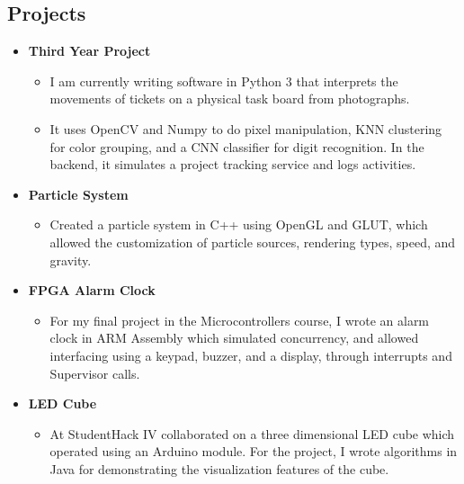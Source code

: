 \documentclass[hidelinks,11pt,a4paper,roman]{moderncv}
\begin{document}
\subsection{Projects}
\begin{itemize}%
\item \textbf{Third Year Project}
  \begin{itemize}%
  \item {I am currently writing software in Python 3 that interprets the movements of tickets on a physical task board from photographs.}
  \item {It uses OpenCV and Numpy to do pixel manipulation, KNN clustering for color grouping, and a CNN classifier for digit recognition. In the backend, it simulates a project tracking service and logs activities.}
  \end{itemize}
\item \textbf{Particle System}
  \begin{itemize}
    \item {Created a particle system in C++ using OpenGL and GLUT, which allowed the customization of particle sources, rendering types, speed, and gravity.}
  \end{itemize}
\item \textbf{FPGA Alarm Clock}
  \begin{itemize}
    \item {For my final project in the Microcontrollers course, I wrote an alarm clock in ARM Assembly which simulated concurrency, and allowed interfacing using a keypad, buzzer, and a display, through interrupts and Supervisor calls.}
  \end{itemize}
\item \textbf{LED Cube}
\begin{itemize}
  \item{At StudentHack IV collaborated on a three dimensional LED cube which operated using an Arduino module. For the project, I wrote algorithms in Java for demonstrating the visualization features of the cube.}
\end{itemize}
\end{itemize}

\end{document}
